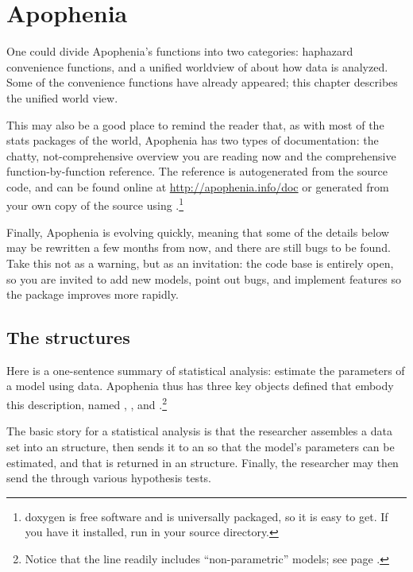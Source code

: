 \startonecol \chapter{Apophenia} \label{apop} \endonecol

One could divide Apophenia's functions into two categories: haphazard
convenience functions, and a unified worldview of about how data is
analyzed. Some of the convenience functions have already appeared; this
chapter describes the unified world view. 

This may also be a good place to remind the reader that, as with
most of the stats packages of the world, Apophenia has two types of
documentation: the chatty, not-comprehensive overview you are reading
now and the comprehensive function-by-function reference. The reference
is autogenerated from the source code, and can be found online at
\url{http://apophenia.info/doc} or generated from your own copy of the
source using .\footnote{doxygen is free software and
is universally packaged, so it is easy to get. If you have it installed,
run  in your source directory.}

Finally, Apophenia is evolving quickly, meaning that some of the details
below may be rewritten a few months from now, and there are still bugs
to be found. Take this not as a warning, but as an invitation: the code
base is entirely open, so you are invited to add new models, point out
bugs, and implement features so the package improves more rapidly.

\section{The structures}
Here is a one-sentence summary of statistical analysis: estimate the
parameters of a model using data. Apophenia thus has three key objects
defined that embody this description, named ,
, and .\footnote{Notice
that the  line readily includes
``non-parametric'' models; see page \pageref{nonparam}.}

The basic story for a statistical analysis is that the researcher
assembles a data set into an  structure, then sends it to
an  so that the model's parameters can be estimated,
and that is returned in an  structure. Finally, the
researcher may then send the  through various
hypothesis tests.

